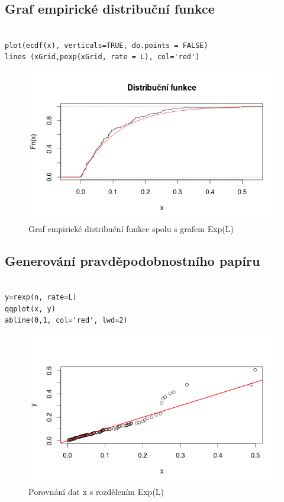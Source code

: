 \documentclass[12pt]{article}
\begin{document}
\subsection{Graf empirické distribuční funkce}
  \begin{lstlisting}[frame=single]  % Start your code-block
  
plot(ecdf(x), verticals=TRUE, do.points = FALSE)
lines (xGrid,pexp(xGrid, rate = L), col='red')
\end{lstlisting}
\begin{figure}[ht!]
	\includegraphics[scale=0.5]{img/1_3empiricka_distribucni_funkce}\centering
	\caption{Graf empirické distribuční funkce spolu s grafem Exp(L)}
	\label{obr:sikme}
\end{figure}

\subsection{Generování pravděpodobnostního papíru}
  \begin{lstlisting}[frame=single]  % Start your code-block
  
y=rexp(n, rate=L)
qqplot(x, y)
abline(0,1, col='red', lwd=2)
\end{lstlisting}
\begin{figure}[ht!]
	\includegraphics[scale=0.5]{img/1_4_pravdepodobnostni_papir}\centering
	\caption{Porovnání dat x s rozdělením Exp(L)}
	\label{obr:sikme}
\end{figure}
\end{document}
